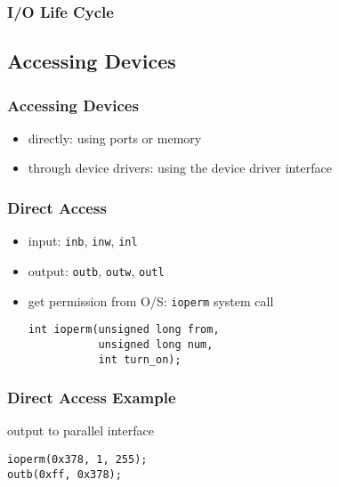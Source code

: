 \documentclass[dvipsnames]{beamer}
\begin{document}
\begin{frame}
  \frametitle{I/O Life Cycle}

  \begin{center}
  \end{center}
\end{frame}

\subsection{Accessing Devices}

\begin{frame}
  \frametitle{Accessing Devices}

  \begin{itemize}
    \item directly: using ports or memory

    \medskip
    \item through device drivers: using the device driver interface
  \end{itemize}
\end{frame}

\begin{frame}[fragile]
  \frametitle{Direct Access}

  \begin{itemize}
    \item input: \lstinline|inb|, \lstinline|inw|, \lstinline|inl|
    \item output: \lstinline|outb|, \lstinline|outw|, \lstinline|outl|

    \pause
    \medskip
    \item get permission from O/S: \lstinline{ioperm} system call
    \begin{lstlisting}
int ioperm(unsigned long from,
           unsigned long num,
           int turn_on);
    \end{lstlisting}
  \end{itemize}
\end{frame}

\begin{frame}[fragile]
  \frametitle{Direct Access Example}

  \begin{exampleblock}{output to parallel interface}
    \begin{lstlisting}
ioperm(0x378, 1, 255);
outb(0xff, 0x378);
    \end{lstlisting}
  \end{exampleblock}
\end{frame}
\end{document}
